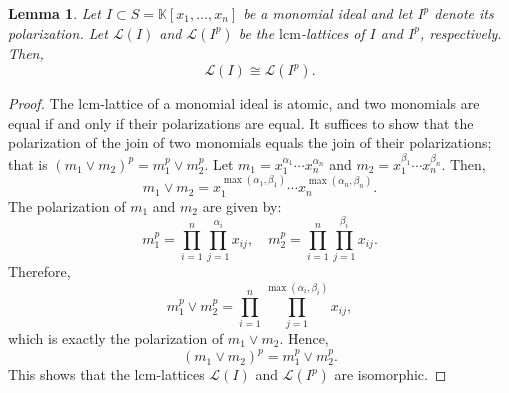 \documentclass[11pt]{amsart}
\newcommand{\lcm}{\mathrm{lcm}}
\theoremstyle{plain}
\newtheorem{lemma}{Lemma}
\numberwithin{lemma}{\DefaultNumberTheoremWithin}
\numberwithin{claim}{\DefaultNumberTheoremWithin}
\numberwithin{theorem}{\DefaultNumberTheoremWithin}
\numberwithin{corollary}{\DefaultNumberTheoremWithin}
\numberwithin{proposition}{\DefaultNumberTheoremWithin}
\numberwithin{conjecture}{\DefaultNumberTheoremWithin}
\theoremstyle{definition}
\newtheorem{definition}{Definition}
\numberwithin{definition}{\DefaultNumberTheoremWithin}
\theoremstyle{definition}
\numberwithin{question}{\DefaultNumberTheoremWithin}
\theoremstyle{definition}
\numberwithin{problem}{\DefaultNumberTheoremWithin}
\theoremstyle{remark}
\newtheorem{remark}{Remark}
\numberwithin{remark}
     {\DefaultNumberTheoremWithin}
\theoremstyle{remark}
\numberwithin{example}{\DefaultNumberTheoremWithin}
\begin{document}
\begin{lemma}\label{Tpolarization}
    Let \( I \subset S = \mathbb{K}[x_1, \ldots, x_n] \) be a monomial ideal and let \( I^p \) denote its polarization. Let \( \mathcal{L}(I) \) and \( \mathcal{L}(I^p) \) be the $\lcm$-lattices of \( I \) and \( I^p \), respectively. Then,
    \[
    \mathcal{L}(I) \cong \mathcal{L}(I^p).
    \]
\end{lemma}

\begin{proof}
    The $\lcm$-lattice of a monomial ideal is atomic, and two monomials are equal if and only if their polarizations are equal. It suffices to show that the polarization of the join of two monomials equals the join of their polarizations; that is $(m_1 \vee m_2)^p = m_1^p \vee m_2^p$.
    Let \( m_1 = x_1^{\alpha_1} \cdots x_n^{\alpha_n} \) and \( m_2 = x_1^{\beta_1} \cdots x_n^{\beta_n} \). Then,
    \[
    m_1 \vee m_2 = x_1^{\max(\alpha_1, \beta_1)} \cdots x_n^{\max(\alpha_n, \beta_n)}.
    \]
    The polarization of \( m_1 \) and \( m_2 \) are given by:
    \[
    m_1^p = \prod_{i=1}^n \prod_{j=1}^{\alpha_i} x_{ij}, \quad
    m_2^p = \prod_{i=1}^n \prod_{j=1}^{\beta_i} x_{ij}.
    \]
    Therefore,
    \[
    m_1^p \vee m_2^p = \prod_{i=1}^n \prod_{j=1}^{\max(\alpha_i, \beta_i)} x_{ij},
    \]
    which is exactly the polarization of \( m_1 \vee m_2 \). Hence,
    \[
    (m_1 \vee m_2)^p = m_1^p \vee m_2^p.
    \]
    This shows that the $\lcm$-lattices \( \mathcal{L}(I) \) and \( \mathcal{L}(I^p) \) are isomorphic.
\end{proof}

\end{document}

